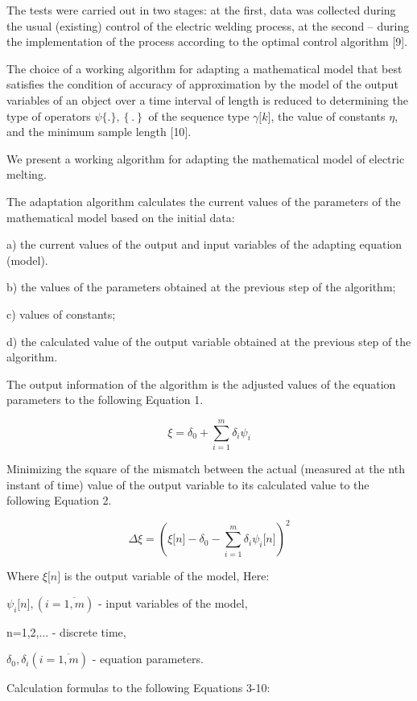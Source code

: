 \begin{multicols}{2}
The tests were carried out in two stages: at the first, data was
collected during the usual (existing) control of the electric welding
process, at the second -- during the implementation of the process
according to the optimal control algorithm {[}9{]}.

The choice of a working algorithm for adapting a mathematical model that
best satisfies the condition of accuracy of approximation by the model
of the output variables of an object over a time interval of length is
reduced to determining the type of operators
\(\psi\{.\},\left\{ . \right\}\) of the sequence type
\(\gamma\lbrack k\rbrack\), the value of constants \(\eta\), and the
minimum sample length {[}10{]}.

We present a working algorithm for adapting the mathematical model of
electric melting.

The adaptation algorithm calculates the current values of the parameters
of the mathematical model based on the initial data:

a) the current values of the output and input variables of the adapting
equation (model).

b) the values of the parameters obtained at the previous step of the
algorithm;

c) values of constants;

d) the calculated value of the output variable obtained at the previous
step of the algorithm.

The output information of the algorithm is the adjusted values of the
equation parameters to the following Equation 1.

\begin{equation}
\xi = \delta_{0} + \sum_{i = 1}^{m}\delta_{i}\psi_{i}
\end{equation}

Minimizing the square of the mismatch between the actual (measured at
the nth instant of time) value of the output variable to its calculated
value to the following Equation 2.

\begin{equation}
\Delta\xi = (\xi\lbrack n\rbrack - \delta_{0} - \sum_{i = 1}^{m}{\delta_{i}\psi_{i}}\lbrack n\rbrack)^{2}
\end{equation}

Where \(\xi\lbrack n\rbrack\) is the output variable of the model, Here:

\(\psi_{i}\lbrack n\rbrack,(i = \overline{1,m})\) - input variables of
the model,

n=1,2,... - discrete time,

\(\delta_{0},\delta_{i}(i = \overline{1,m})\) - equation parameters.

Calculation formulas to the following Equations 3-10:
\end{multicols}

